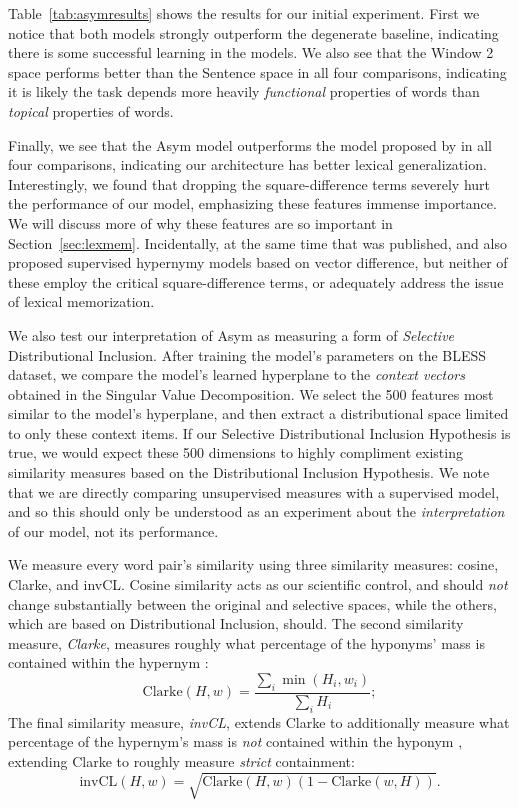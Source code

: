 \documentclass[12pt]{article}
\begin{document}
Table~\ref{tab:asymresults} shows the results for our initial experiment.
First we notice that both models strongly outperform the degenerate baseline,
indicating there is some successful learning in the models. We also see that
the Window 2 space performs better than the Sentence space in all four
comparisons, indicating it is likely the task depends more heavily {\em
functional} properties of words than {\em topical} properties of words.

Finally, we see that the Asym model outperforms the model proposed by
 in all four comparisons, indicating our architecture
has better lexical generalization.
Interestingly, we found that dropping the square-difference terms
severely hurt the performance of our model, emphasizing these features immense
importance. We will discuss more of why these features are so important in
Section~\ref{sec:lexmem}. Incidentally, at the same time that
 was published,  and
 also proposed supervised hypernymy models based on vector
difference, but neither of these employ the critical square-difference terms,
or adequately address the issue of lexical memorization.

We also test our interpretation of Asym as measuring a form of {\em Selective}
Distributional Inclusion. After training the model's parameters on the BLESS
dataset, we compare the model's learned hyperplane to the {\em context
vectors} obtained in the Singular Value Decomposition. We select the 500
features most similar to the model's hyperplane, and then extract a
distributional space limited to only these context items. If our Selective
Distributional Inclusion Hypothesis is true, we would expect these 500
dimensions to highly compliment existing similarity measures based on the
Distributional Inclusion Hypothesis. We note that we are directly comparing
unsupervised measures with a supervised model, and so this should only be
understood as an experiment about the {\em interpretation} of our model, not
its performance.

We measure every word pair's similarity using three similarity measures:
cosine, Clarke, and invCL. Cosine similarity acts as our scientific control, and
should {\em not} change substantially between the
original and selective spaces, while the others, which are
based on Distributional Inclusion, should. The second similarity measure,
{\em Clarke}, measures roughly what percentage of the hyponyms' mass is contained
within the hypernym \cite{clarke:2009:gems}:
\begin{equation*}
  \text{Clarke}(H, w) = \frac{\sum_i \min(H_i, w_i)}{\sum_i H_i};
\end{equation*}
The final similarity measure, {\em invCL}, extends Clarke to additionally
measure what percentage of the hypernym's mass is {\em not} contained within
the hyponym \cite{lenci:2012:starsem}, extending Clarke to roughly measure
{\em strict} containment:
\begin{equation*}
  \text{invCL}(H, w) = \sqrt{\text{Clarke}(H, w)(1 - \text{Clarke}(w, H))}.
\end{equation*}
\end{document}
